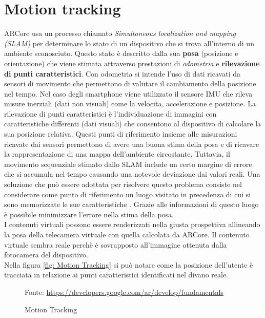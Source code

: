 \documentclass[crop=false, class=book]{standalone}
\begin{document}
	\section{Motion tracking}
	
		ARCore usa un processo chiamato \emph{Simultaneous localization and mapping (SLAM)} per determinare lo stato di un
		dispositivo che si trova all'interno di un ambiente sconosciuto. Questo stato è descritto dalla sua \textbf{posa} (posizione e orientazione) che viene stimata attraverso prestazioni di \emph{odometria} e \textbf{rilevazione di punti caratteristici}. Con odometria si intende l'uso di dati ricavati da sensori di movimento che permettono di valutare il cambiamento della posizione nel tempo. Nel caso degli smartphone viene utilizzato il sensore IMU che rileva misure inerziali (dati non visuali) come la velocita, accelerazione e posizione. La rilevazione di punti caratteristici è l'individuazione di immagini con caratteristiche differenti (dati visuali) che	consentono al dispositivo di calcolare la sua posizione relativa. Questi punti di riferimento insieme alle misurazioni ricavate dai sensori permettono di avere una buona stima della posa e di ricavare la rappresentazione di una mappa dell'ambiente circostante. Tuttavia, il movimento sequenziale stimato dallo SLAM include un certo margine di errore che si accumula nel tempo causando una notevole deviazione dai valori reali. Una soluzione che può essere adottata per risolvere questo problema consiste nel considerare come punto di riferimento un luogo visitato in precedenza di cui si sono memorizzate le sue caratteristiche \cite{mathworks2022slam}. Grazie alle informazioni di questo luogo è possibile minimizzare l'errore nella stima della posa.\\
		I contenuti virtuali possono essere renderizzati nella giusta prospettiva allineando la posa della telecamera virtuale con quella calcolata da ARCore. Il contenuto virtuale sembra reale perchè è sovrapposto all'immagine ottenuta dalla 			fotocamera del dispositivo.\\
		Nella figura \vref{fig: Motion Tracking} si può notare come la posizione dell'utente è tracciata in relazione ai punti caratteristici identificati nel divano reale.
		
		\begin{figure}
				\centering
				{Fonte: \url{https://developers.google.com/ar/develop/fundamentals}}
				\caption{Motion Tracking}
				\label{fig: Motion Tracking}
		\end{figure}
		
\end{document}
